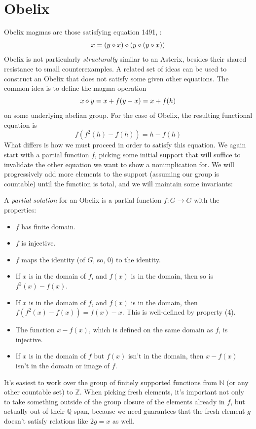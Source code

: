 \section{Obelix}
Obelix magmas are those satisfying equation 1491, :
$$x = (y \diamond x) \diamond (y \diamond (y \diamond x))$$
Obelix is not particularly {\em structurally} similar to an Asterix, besides their shared resistance
to small counterexamples. A related set of ideas can be used to construct an Obelix that does not
satisfy some given other equations. The common idea is to define the magma operation
$$ x \diamond y = x + f(y-x) = x + f(h)$$
on some underlying abelian group. For the case of Obelix, the resulting functional equation is
\begin{equation}\label{fh2}
  f(f^{2}(h) - f(h)) = h - f(h)
\end{equation}
What differs is how we must proceed in order to satisfy this equation. We again start with a partial function $f$,
picking some initial support that will suffice to invalidate the other equation we want to show a nonimplication for.
We will progressively add more elements to the support (assuming our group is countable) until the function
is total, and we will maintain some invariants:
\begin{definition}\label{partial-solution2}  A \emph{partial solution} for an Obelix is a partial function $f : G \to G$
with the properties:
\begin{itemize}
  \item $f$ has finite domain.
  \item $f$ is injective.
  \item $f$ maps the identity (of $G$, so, 0) to the identity.
  \item If $x$ is in the domain of $f$, and $f(x)$ is in the domain, then so is $f^2(x) - f(x)$.
  \item If $x$ is in the domain of $f$, and $f(x)$ is in the domain, then $f(f^2(x) - f(x)) = f(x) - x$. This is well-defined by property (4).
  \item The function $x - f(x)$, which is defined on the same domain as $f$, is injective.
  \item If $x$ is in the domain of $f$ but $f(x)$ isn't in the domain, then $x - f(x)$ isn't in the domain or image of $f$.
\end{itemize}
\end{definition}
It's easiest to work over the group of finitely supported functions from $\mathbb{N}$ (or any other
countable set) to $\mathbb{Z}$. When picking fresh elements, it's important not only to take something
outside of the group closure of the elements already in $f$, but actually out of their $\mathbb{Q}$-span,
because we need guarantees that the fresh element $g$ doesn't satisfy relations like $2g = x$ as well.

